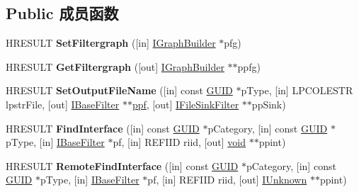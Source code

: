 \subsection*{Public 成员函数}
\begin{DoxyCompactItemize}
\item 
\mbox{\label{interface_i_capture_graph_builder2_aa6bba7d07f151dbe7d5ed412b7a09de7}} 
H\+R\+E\+S\+U\+LT {\bfseries Set\+Filtergraph} (\mbox{[}in\mbox{]} \hyperlink{interface_i_graph_builder}{I\+Graph\+Builder} $\ast$pfg)
\item 
\mbox{\label{interface_i_capture_graph_builder2_a5c422ca37a024f9ec9b4955585358194}} 
H\+R\+E\+S\+U\+LT {\bfseries Get\+Filtergraph} (\mbox{[}out\mbox{]} \hyperlink{interface_i_graph_builder}{I\+Graph\+Builder} $\ast$$\ast$ppfg)
\item 
\mbox{\label{interface_i_capture_graph_builder2_a21f8618d3de78740c44bff94f950a7e9}} 
H\+R\+E\+S\+U\+LT {\bfseries Set\+Output\+File\+Name} (\mbox{[}in\mbox{]} const \hyperlink{interface_g_u_i_d}{G\+U\+ID} $\ast$p\+Type, \mbox{[}in\mbox{]} L\+P\+C\+O\+L\+E\+S\+TR lpstr\+File, \mbox{[}out\mbox{]} \hyperlink{interface_i_base_filter}{I\+Base\+Filter} $\ast$$\ast$\hyperlink{struct__paraformat}{ppf}, \mbox{[}out\mbox{]} \hyperlink{interface_i_file_sink_filter}{I\+File\+Sink\+Filter} $\ast$$\ast$pp\+Sink)
\item 
\mbox{\label{interface_i_capture_graph_builder2_aafa3502a144d9edf9d9de738a084ecaf}} 
H\+R\+E\+S\+U\+LT {\bfseries Find\+Interface} (\mbox{[}in\mbox{]} const \hyperlink{interface_g_u_i_d}{G\+U\+ID} $\ast$p\+Category, \mbox{[}in\mbox{]} const \hyperlink{interface_g_u_i_d}{G\+U\+ID} $\ast$p\+Type, \mbox{[}in\mbox{]} \hyperlink{interface_i_base_filter}{I\+Base\+Filter} $\ast$pf, \mbox{[}in\mbox{]} R\+E\+F\+I\+ID riid, \mbox{[}out\mbox{]} \hyperlink{interfacevoid}{void} $\ast$$\ast$ppint)
\item 
\mbox{\label{interface_i_capture_graph_builder2_afb736ae311878319c7dcb9c7720f80f5}} 
H\+R\+E\+S\+U\+LT {\bfseries Remote\+Find\+Interface} (\mbox{[}in\mbox{]} const \hyperlink{interface_g_u_i_d}{G\+U\+ID} $\ast$p\+Category, \mbox{[}in\mbox{]} const \hyperlink{interface_g_u_i_d}{G\+U\+ID} $\ast$p\+Type, \mbox{[}in\mbox{]} \hyperlink{interface_i_base_filter}{I\+Base\+Filter} $\ast$pf, \mbox{[}in\mbox{]} R\+E\+F\+I\+ID riid, \mbox{[}out\mbox{]} \hyperlink{interface_i_unknown}{I\+Unknown} $\ast$$\ast$ppint)
$$
\end{DoxyCompactItemize}
